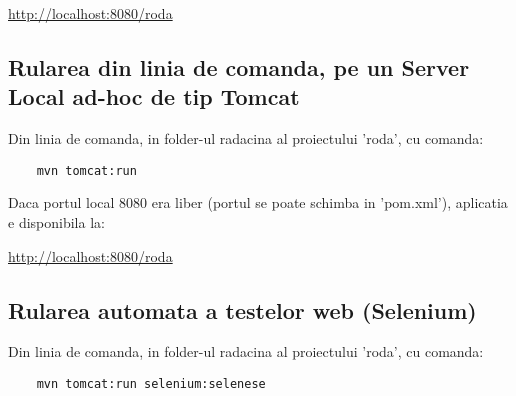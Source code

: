 \url{http://localhost:8080/roda}

\subsection{Rularea din linia de comanda, pe un Server Local ad-hoc de tip
Tomcat}
Din linia de comanda, in folder-ul radacina al proiectului 'roda', cu comanda:
\begin{lstlisting}
	mvn tomcat:run
\end{lstlisting}
Daca portul local 8080 era liber (portul se poate schimba in 'pom.xml'),
aplicatia e disponibila la:

\url{http://localhost:8080/roda}

\subsection{Rularea automata a testelor web (Selenium)}
Din linia de comanda, in folder-ul radacina al proiectului 'roda', cu comanda:
\begin{lstlisting}
	mvn tomcat:run selenium:selenese
\end{lstlisting}

